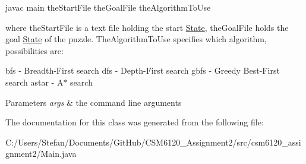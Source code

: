 javac main the\+Start\+File the\+Goal\+File the\+Algorithm\+To\+Use

where the\+Start\+File is a text file holding the start \hyperlink{classcsm6120__assignment2_1_1_state}{State}, the\+Goal\+File holds the goal \hyperlink{classcsm6120__assignment2_1_1_state}{State} of the puzzle. The\+Algorithm\+To\+Use specifies which algorithm, possibilities are\+:

bfs -\/ Breadth-\/\+First search dfs -\/ Depth-\/\+First search gbfs -\/ Greedy Best-\/\+First search astar -\/ A$\ast$ search


\begin{DoxyParams}{Parameters}
{\em args} & the command line arguments \\
\hline
\end{DoxyParams}


The documentation for this class was generated from the following file\+:\begin{DoxyCompactItemize}
\item 
C\+:/\+Users/\+Stefan/\+Documents/\+Git\+Hub/\+C\+S\+M6120\+\_\+\+Assignment2/src/csm6120\+\_\+assignment2/Main.\+java\end{DoxyCompactItemize}
